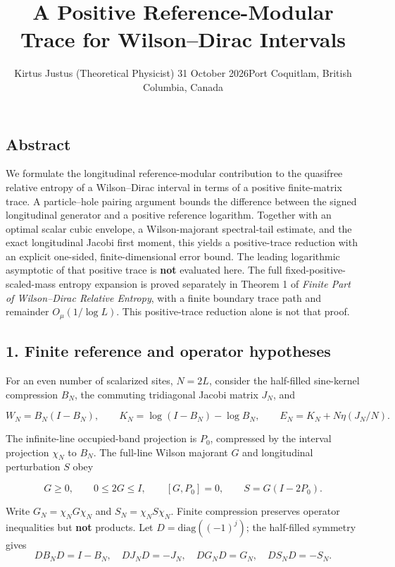 \documentclass[
  10pt,
  a4paper,
]{article}
\title{A Positive Reference-Modular Trace for Wilson--Dirac Intervals}
\author{Kirtus Justus (Theoretical Physicist) \textbullet{} 31 October 2026\tabularnewline Port Coquitlam, British Columbia, Canada}
\date{}
\begin{document}
\maketitle

\subsection{Abstract}\label{abstract}

We formulate the longitudinal reference-modular contribution to the quasifree relative entropy of a Wilson--Dirac interval in terms of a positive finite-matrix trace. A particle--hole pairing argument bounds the difference between the signed longitudinal generator and a positive reference logarithm. Together with an optimal scalar cubic envelope, a Wilson-majorant spectral-tail estimate, and the exact longitudinal Jacobi first moment, this yields a positive-trace reduction with an explicit one-sided, finite-dimensional error bound. The leading logarithmic asymptotic of that positive trace is \textbf{not} evaluated here. The full fixed-positive-scaled-mass entropy expansion is proved separately in Theorem 1 of \emph{Finite Part of Wilson--Dirac Relative Entropy}, with a finite boundary trace path and remainder \(O_\mu(1/\log L)\). This positive-trace reduction alone is not that proof.

\subsection{1. Finite reference and operator hypotheses}\label{finite-reference-and-operator-hypotheses}

For an even number of scalarized sites, \(N=2L\), consider the half-filled sine-kernel compression \(B_N\), the commuting tridiagonal Jacobi matrix \(J_N\), and

\[
W_N=B_N(I-B_N),\qquad K_N=\log(I-B_N)-\log B_N,\qquad
E_N=K_N+N\eta(J_N/N).
\]

The infinite-line occupied-band projection is \(P_0\), compressed by the interval projection \(\chi_N\) to \(B_N\). The full-line Wilson majorant \(G\) and longitudinal perturbation \(S\) obey

\[
G\ge0,\qquad 0\le2G\le I,\qquad [G,P_0]=0,\qquad S=G(I-2P_0).
\]

Write \(G_N=\chi_NG\chi_N\) and \(S_N=\chi_NS\chi_N\). Finite compression preserves operator inequalities but \textbf{not} products. Let \(D=\mathrm{diag}((-1)^j)\); the half-filled symmetry gives \[
DB_ND=I-B_N,\quad DJ_ND=-J_N,\quad DG_ND=G_N,\quad DS_ND=-S_N.
\]
\end{document}
